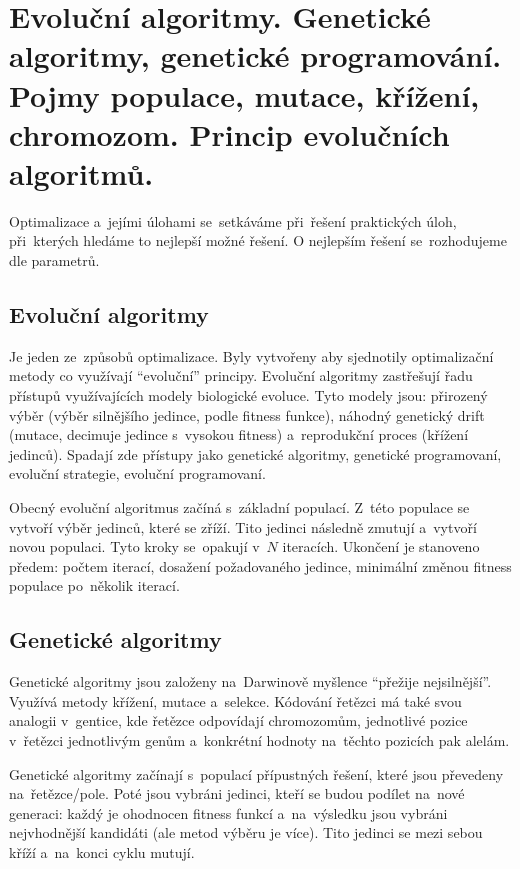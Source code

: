 \clearpage
\section{Evoluční algoritmy. Genetické algoritmy, genetické programování. Pojmy populace, mutace, křížení, chromozom. Princip evolučních algoritmů.}

Optimalizace a~jejími úlohami se~setkáváme při~řešení praktických úloh, při~kterých hledáme to nejlepší možné řešení. O nejlepším řešení se~rozhodujeme dle parametrů.

\subsection{Evoluční algoritmy}

Je jeden ze~způsobů optimalizace. Byly vytvořeny aby sjednotily optimalizační metody co využívají \enquote{evoluční} principy. Evoluční algoritmy zastřešují řadu přístupů využívajících modely biologické evoluce. Tyto modely jsou: přirozený výběr (výběr silnějšího jedince, podle fitness funkce), náhodný genetický drift (mutace, decimuje jedince s~vysokou fitness) a~reprodukční proces (křížení jedinců). Spadají zde přístupy jako genetické algoritmy, genetické programovaní, evoluční strategie, evoluční programovaní.

Obecný evoluční algoritmus začíná s~základní populací. Z~této populace se vytvoří výběr jedinců, které se zříží. Tito jedinci následně zmutují a~vytvoří novou populaci. Tyto kroky se~opakují v~\( N \) iteracích. Ukončení je stanoveno předem: počtem iterací, dosažení požadovaného jedince, minimální změnou fitness populace po~několik iterací.

\subsection{Genetické algoritmy}

Genetické algoritmy jsou založeny na~Darwinově myšlence \enquote{přežije nejsilnější}. Využívá metody křížení, mutace a~selekce. Kódování řetězci má také svou analogii v~gentice, kde řetězce odpovídají chromozomům, jednotlivé pozice v~řetězci jednotlivým genům a~konkrétní hodnoty na~těchto pozicích pak alelám.

Genetické algoritmy začínají s~populací přípustných řešení, které jsou převedeny na~řetězce/pole. Poté jsou vybráni jedinci, kteří se budou podílet na~nové generaci: každý je ohodnocen fitness funkcí a~na~výsledku jsou vybráni nejvhodnější kandidáti (ale metod výběru je více). Tito jedinci se mezi sebou kříží a~na~konci cyklu mutují.

